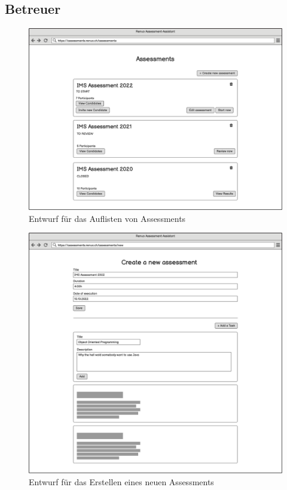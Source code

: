 \subsection{Betreuer}
\begin{figure}[H]
    \centering
    \includegraphics[width=12cm]{images/mockups/supervisor-list-assessments.png}
    \caption{\label{fig:mockup-supervisor-list-assessments}Entwurf für das Auflisten von Assessments}
\end{figure}
\begin{figure}[H]
    \centering
    \includegraphics[width=12cm]{images/mockups/supervisor-create-assessment.png}
    \caption{\label{fig:mockup-supervisor-create-assessment}Entwurf für das Erstellen eines neuen Assessments}
\end{figure}

